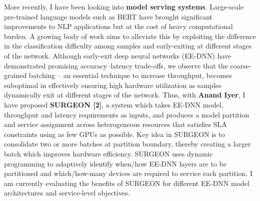 \documentclass{article}
\begin{document}

More recently, I have been looking into \textbf{model serving systems}. Large-scale pre-trained language models such as BERT have brought significant improvements to NLP applications but at the cost of heavy computational burden. A growing body of work aims to alleviate this by exploiting the difference in the classification difficulty among samples and early-exiting at different stages of the network. 
Although early-exit deep neural networks (EE-DNN) have demonstrated promising accuracy–latency trade-offs, we observe that the coarse-grained batching -- an essential technique to increase throughput, becomes suboptimal in effectively ensuring high hardware utilization as samples dynamically exit at different stages of the network. 
Thus, with \textbf{Anand Iyer}, I have proposed \textbf{SURGEON [2]}, a system which takes EE-DNN model, throughput and latency requirements as inputs, and produces a model partition and service assignment across heterogeneous resources that satisfies SLA constraints using as few GPUs as possible. 
Key idea in SURGEON is to consolidate two or more batches at partition boundary, thereby creating a larger batch which  improves hardware efficiency. SURGEON uses dynamic programming to adaptively identify when/how EE-DNN layers are to be partitioned and which/how-many devices are required to service each partition. I am currently evaluating the benefits of SURGEON for different EE-DNN model architectures and service-level objectives.

\end{document}
